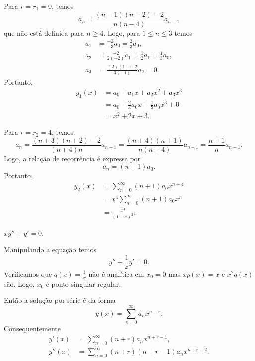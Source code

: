 \documentclass[a4paper,12pt, leqno, answers]{exam}
\begin{document}
\begin{questions}
\begin{solution}
        Para $r = r_1 = 0$, temos
        \[
        a_n = \frac{\left( n - 1 \right) \left( n - 2 \right) - 2}{n \left( n - 4 \right)} a_{n - 1}
        \]
        que n\~{a}o est\'{a} definida para $n \geq 4$. Logo, para $1 \leq n \leq 3$ temos
        \begin{align*}
            a_1 &= \frac{-2}{-3} a_0 = \frac{2}{3} a_0, \\
            a_2 &= \frac{-2}{2 \left( -2 \right)} a_1 = \frac{1}{2} a_1 = \frac{1}{3} a_0, \\
            a_3 &= \frac{\left( 2 \right) \left( 1 \right) - 2}{3\left( -1 \right)} a_2 = 0.
        \end{align*}
        Portanto,
        \begin{align*}
            y_1(x) &= a_0 + a_1 x + a_2 x^2 + a_3 x^3 \\
            &= a_0 + \frac{2}{3} a_0 x + \frac{1}{3} a_0 x^3 + 0 \\
            &= x^2 + 2 x + 3.
        \end{align*}

        Para $r = r_2 = 4$, temos
        \[
        a_n = \frac{\left( n + 3 \right) \left( n + 2 \right) - 2}{\left( n + 4 \right) n} a_{n - 1} = \frac{\left( n + 4 \right) \left( n + 1 \right)}{n \left( n + 4 \right)} a_{n - 1} = \frac{n + 1}{n} a_{n - 1}.
        \]
        Logo, a rela\c{c}\~{a}o de recorr\^{e}ncia \'{e} expressa por
        \[
        a_n = \left( n + 1 \right) a_0.
        \]
        Portanto,
        \begin{align*}
            y_2 (x) &= \sum_{n = 0}^\infty \left( n + 1 \right) a_0 x^{n + 4} \\
            &= x^4 \sum_{n = 0}^\infty \left( n + 1 \right) a_0 x^n \\
            &= \frac{x^4}{\left( 1 - x \right)^2}.
        \end{align*}
    \end{solution}

    \question $x y'' + y' = 0$.
    \begin{solution}
        Manipulando a equa\c{c}\~{a}o temos
        \[
        y'' + \frac{1}{x} y' = 0.
        \]
        Verificamos que $q(x) = \frac{1}{x}$ n\~{a}o \'{e} anal\'{i}tica em $x_0 = 0$ mas $x p(x) = x$ e $x^2 q(x)$ s\~{a}o. Logo, $x_0$ \'{e} ponto singular regular.

        Ent\~{a}o a solu\c{c}\~{a}o por s\'{e}rie \'{e} da forma
        \[
        y(x) = \sum_{n = 0}^\infty a_n x^{n + r}.
        \]
        Consequentemente
        \begin{align*}
            y'(x) &= \sum_{n = 0}^\infty \left( n + r \right) a_n x^{n + r - 1}, \\
            y''(x) &= \sum_{n = 0}^\infty \left( n + r \right) \left( n + r - 1 \right) a_n x^{n + r - 2}.
        \end{align*}


\end{solution}
\end{questions}
\end{document}
